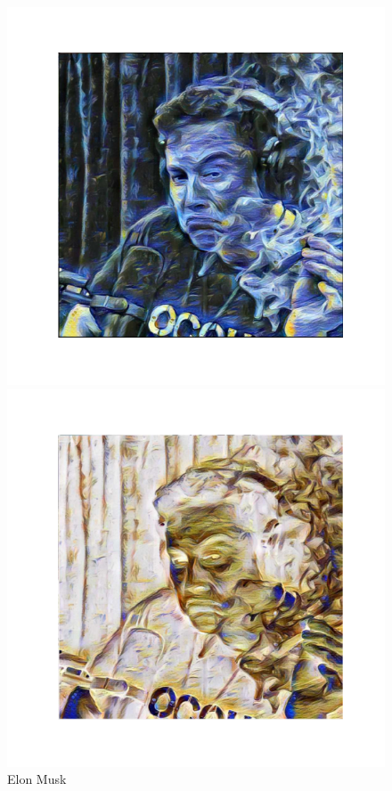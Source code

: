 \documentclass{42-en}
\begin{document}
\begin{figure}[h!]
  \begin{minipage}[l]{0.49\linewidth}
    \includegraphics[scale=0.38]{assets/elon_canaGAN.png}
    \vspace{-50pt}
    \caption{Elon Musk}
  \end{minipage}
  \hfill
  \begin{minipage}[c]{0.49\linewidth}
    \includegraphics[scale=0.38]{assets/elon_inverted.png}

\end{minipage}
\end{figure}
\end{document}
